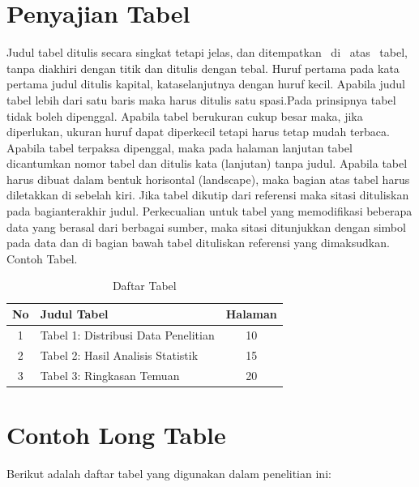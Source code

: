 \section*{Penyajian Tabel }
Judul tabel ditulis secara singkat tetapi jelas, dan ditempatkan  di  atas  tabel, tanpa diakhiri dengan titik dan ditulis dengan tebal. Huruf pertama pada kata pertama judul ditulis kapital, kataselanjutnya dengan huruf kecil. Apabila judul tabel lebih dari satu baris maka harus ditulis satu spasi.Pada prinsipnya tabel tidak boleh dipenggal. Apabila tabel berukuran cukup besar maka, jika diperlukan, ukuran huruf dapat diperkecil tetapi harus tetap mudah terbaca. Apabila tabel terpaksa dipenggal, maka pada halaman lanjutan tabel dicantumkan nomor tabel dan ditulis kata (lanjutan) tanpa judul. Apabila tabel harus dibuat dalam bentuk horisontal (landscape), maka bagian atas tabel harus diletakkan di sebelah kiri. Jika tabel dikutip dari referensi maka sitasi dituliskan pada bagianterakhir judul. Perkecualian untuk tabel yang memodifikasi beberapa data yang berasal dari berbagai sumber, maka sitasi ditunjukkan dengan simbol pada data dan di bagian bawah tabel dituliskan referensi yang dimaksudkan. Contoh Tabel.
\begin{table}[h]
	\centering
	\caption{Daftar Tabel}
	\label{tab:daftar_tabel}
	\begin{tabular}{cp{8cm}c}
	\toprule
		\textbf{No} & \textbf{Judul Tabel} & \textbf{Halaman} \\
	\midrule
		1 & Tabel 1: Distribusi Data Penelitian & 10 \\

		2 & Tabel 2: Hasil Analisis Statistik & 15 \\
	
		3 & Tabel 3: Ringkasan Temuan & 20 \\
	\bottomrule
	\end{tabular}
\end{table}

\section*{Contoh Long Table}
Berikut adalah daftar tabel yang digunakan dalam penelitian ini:

